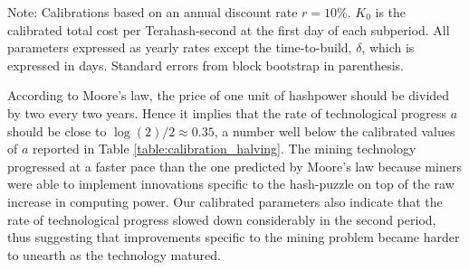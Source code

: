 \documentclass[12pt, a4paper]{article}
\begin{document}
\begin{table}[h]

\footnotesize{Note: Calibrations based on an annual discount rate $r=10\%$. $K_0$ is the calibrated total cost per Terahash-second at the first day of
each subperiod.
All parameters expressed as yearly rates except the time-to-build, $\delta$, which is expressed in days.
Standard errors from block bootstrap in parenthesis.}

\end{table}


According to Moore's law, the price of one unit of hashpower should be divided by two
every two years. Hence it implies that the rate of technological progress
$a$ should be close to $\log(2)/2\approx0.35$, a number well below the calibrated values of $a$ reported in Table \ref{table:calibration_halving}.
The mining technology
progressed at a faster pace than the one predicted by Moore's law because miners
were able to implement innovations specific to the hash-puzzle on top of
the raw increase in computing power. Our calibrated parameters also indicate
that the rate of technological progress slowed down considerably in the
second period, thus suggesting that improvements specific to the mining problem became harder to
unearth as the technology matured.
\end{document}
